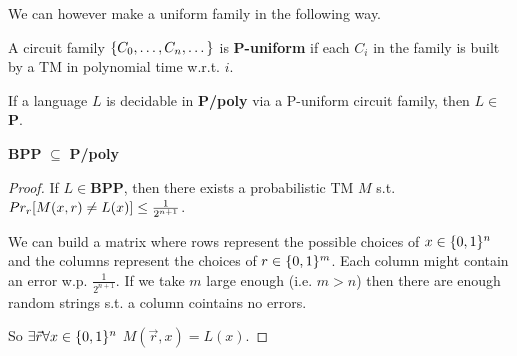 We can however make a uniform family in the following way.

\begin{definition}\label{def:p_uniform}
    A circuit family $\{ C_0, \dots, C_n, \dots \}$ is \textbf{P-uniform} if each $C_i$ in the family is built by a TM in polynomial time w.r.t. $i$.
\end{definition}

\begin{theorem}\label{thm:p_uniform}
    If a language $L$ is decidable in \textbf{P/poly} via a P-uniform circuit family, then $L \in$\textbf{P}.
\end{theorem}

\begin{theorem}\label{thm:bpp_ppoly}
    \textbf{BPP} $\subseteq$ \textbf{P/poly}
\end{theorem}

\begin{proof}
    If $L \in$\textbf{BPP}, then there exists a probabilistic TM $M$ s.t. $Pr_r[M(x,r) \neq L(x)] \leq \frac{1}{2^{n+1}}$.

    We can build a matrix where rows represent the possible choices of $x \in \{ 0,1 \}^n$ and the columns represent the choices of $r \in \{ 0,1 \}^m$.
    Each column might contain an error w.p. $\frac{1}{2^{n+1}}$.
    If we take $m$ large enough (i.e. $m > n$) then there are enough random strings s.t. a column cointains no errors.

    So $\exists \vec{r} \forall x \in \{ 0,1 \}^n$ $M(\vec{r},x) = L(x)$.
\end{proof}

